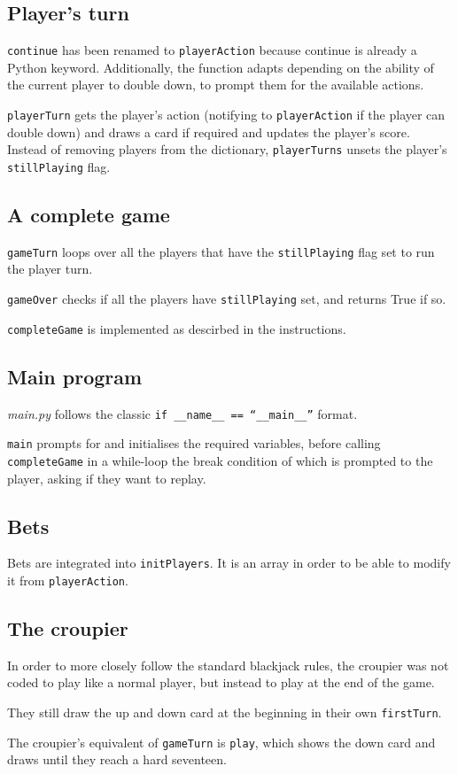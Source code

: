 \documentclass[a4paper, twoside]{report}
\begin{document}
        \subsection{Player's turn}
            \texttt{continue} has been renamed to \texttt{playerAction} because continue is already a Python keyword. Additionally, the function adapts depending on the ability of the current player to double down, to prompt them for the available actions.
            \par \texttt{playerTurn} gets the player's action (notifying to \texttt{playerAction} if the player can double down) and draws a card if required and updates the player's score. Instead of removing players from the dictionary, \texttt{playerTurns} unsets the player's \texttt{stillPlaying} flag.
        
        \subsection{A complete game}    
            \texttt{gameTurn} loops over all the players that have the \texttt{stillPlaying} flag set to run the player turn.
            \par \texttt{gameOver} checks if all the players have \texttt{stillPlaying} set, and returns True if so.
            \par \texttt{completeGame} is implemented as descirbed in the instructions.

        \subsection{Main program}
            \par \textit{main.py} follows the classic \texttt{if \_\_name\_\_ == ``\_\_main\_\_''} format.
            \par \texttt{main} prompts for and initialises the required variables, before calling \texttt{completeGame} in a while-loop the break condition of which is prompted to the player, asking if they want to replay.

        \subsection{Bets}
            \par Bets are integrated into \texttt{initPlayers}. It is an array in order to be able to modify it from \texttt{playerAction}.

        \subsection{The croupier}
            In order to more closely follow the standard blackjack rules, the croupier was not coded to play like a normal player, but instead to play at the end of the game.
            \par They still draw the up and down card at the beginning in their own \texttt{firstTurn}.
            \par The croupier's equivalent of \texttt{gameTurn} is \texttt{play}, which shows the down card and draws until they reach a hard seventeen.
        
\end{document}
